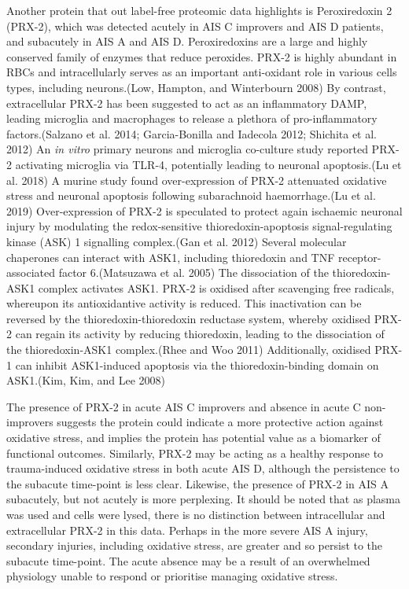 \documentclass[9pt,lineno]{elife}
\begin{document}
\begin{landscape}
\begin{landscape}
Another protein that out label-free proteomic data highlights is Peroxiredoxin 2 (PRX-2), which was detected acutely in AIS C improvers and AIS D patients, and subacutely in AIS A and AIS D. Peroxiredoxins are a large and highly conserved family of enzymes that reduce peroxides.
PRX-2 is highly abundant in RBCs and intracellularly serves as an important anti-oxidant role in various cells types, including neurons.(Low, Hampton, and Winterbourn 2008)
By contrast, extracellular PRX-2 has been suggested to act as an inflammatory DAMP, leading microglia and macrophages to release a plethora of pro-inflammatory factors.(Salzano et al. 2014; Garcia-Bonilla and Iadecola 2012; Shichita et al. 2012)
An \emph{in vitro} primary neurons and microglia co-culture study reported PRX-2 activating microglia via TLR-4, potentially leading to neuronal apoptosis.(Lu et al. 2018)
A murine study found over-expression of PRX-2 attenuated oxidative stress and neuronal apoptosis following subarachnoid haemorrhage.(Lu et al. 2019)
Over-expression of PRX-2 is speculated to protect again ischaemic neuronal injury by modulating the redox-sensitive thioredoxin-apoptosis signal-regulating kinase (ASK) 1 signalling complex.(Gan et al. 2012)
Several molecular chaperones can interact with ASK1, including thioredoxin and TNF receptor-associated factor 6.(Matsuzawa et al. 2005)
The dissociation of the thioredoxin-ASK1 complex activates ASK1.
PRX-2 is oxidised after scavenging free radicals, whereupon its antioxidantive activity is reduced.
This inactivation can be reversed by the thioredoxin-thioredoxin reductase system, whereby oxidised PRX-2 can regain its activity by reducing thioredoxin, leading to the dissociation of the thioredoxin-ASK1 complex.(Rhee and Woo 2011) Additionally, oxidised PRX-1 can inhibit ASK1-induced apoptosis via the thioredoxin-binding domain on ASK1.(Kim, Kim, and Lee 2008)

The presence of PRX-2 in acute AIS C improvers and absence in acute C non-improvers suggests the protein could indicate a more protective action against oxidative stress, and implies the protein has potential value as a biomarker of functional outcomes.
Similarly, PRX-2 may be acting as a healthy response to trauma-induced oxidative stress in both acute AIS D, although the persistence to the subacute time-point is less clear.
Likewise, the presence of PRX-2 in AIS A subacutely, but not acutely is more perplexing.
It should be noted that as plasma was used and cells were lysed, there is no distinction between intracellular and extracellular PRX-2 in this data.
Perhaps in the more severe AIS A injury, secondary injuries, including oxidative stress, are greater and so persist to the subacute time-point.
The acute absence may be a result of an overwhelmed physiology unable to respond or prioritise managing oxidative stress.


\end{landscape}
\end{landscape}
\end{document}
